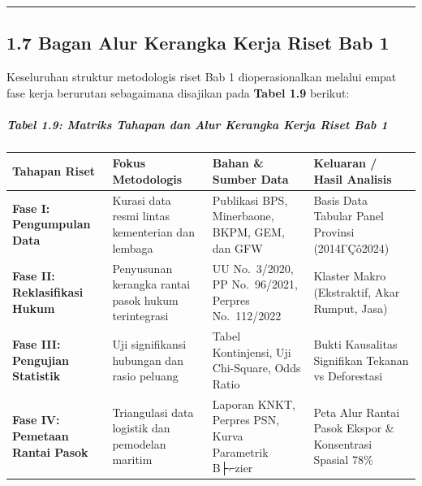 \documentclass[
]{article}
\newcounter{none} %
\begin{document}
\begin{center}\rule{0.5\linewidth}{0.5pt}\end{center}

\subsection{1.7 Bagan Alur Kerangka Kerja Riset Bab
1}\label{bagan-alur-kerangka-kerja-riset-bab-1}

Keseluruhan struktur metodologis riset Bab 1 dioperasionalkan melalui
empat fase kerja berurutan sebagaimana disajikan pada \textbf{Tabel 1.9}
berikut:

\subparagraph{Tabel 1.9: Matriks Tahapan dan Alur Kerangka Kerja Riset
Bab
1}\label{tabel-1.9-matriks-tahapan-dan-alur-kerangka-kerja-riset-bab-1}

{\def\LTcaptype{none} %
\begin{longtable}[]{@{}
  >{\raggedright\arraybackslash}p{}
  >{\raggedright\arraybackslash}p{}
  >{\raggedright\arraybackslash}p{}
  >{\raggedright\arraybackslash}p{}@{}}
\toprule\noalign{}
\begin{minipage}[b]{\linewidth}\raggedright
Tahapan Riset
\end{minipage} & \begin{minipage}[b]{\linewidth}\raggedright
Fokus Metodologis
\end{minipage} & \begin{minipage}[b]{\linewidth}\raggedright
Bahan \& Sumber Data
\end{minipage} & \begin{minipage}[b]{\linewidth}\raggedright
Keluaran / Hasil Analisis
\end{minipage} \\
\midrule\noalign{}
\endhead
\bottomrule\noalign{}
\endlastfoot
\textbf{Fase I: Pengumpulan Data} & Kurasi data resmi lintas kementerian
dan lembaga & Publikasi BPS, Minerbaone, BKPM, GEM, dan GFW & Basis Data
Tabular Panel Provinsi (2014ΓÇô2024) \\
\textbf{Fase II: Reklasifikasi Hukum} & Penyusunan kerangka rantai pasok
hukum terintegrasi & UU No.~3/2020, PP No.~96/2021, Perpres No.~112/2022
& 3 Klaster Makro (Ekstraktif, Akar Rumput, Jasa) \\
\textbf{Fase III: Pengujian Statistik} & Uji signifikansi hubungan dan
rasio peluang & Tabel Kontinjensi, Uji Chi-Square, Odds Ratio & Bukti
Kausalitas Signifikan Tekanan vs Deforestasi \\
\textbf{Fase IV: Pemetaan Rantai Pasok} & Triangulasi data logistik dan
pemodelan maritim & Laporan KNKT, Perpres PSN, Kurva Parametrik B├⌐zier
& Peta Alur Rantai Pasok Ekspor \& Konsentrasi Spasial 78\% \\
\end{longtable}
}
\end{document}
